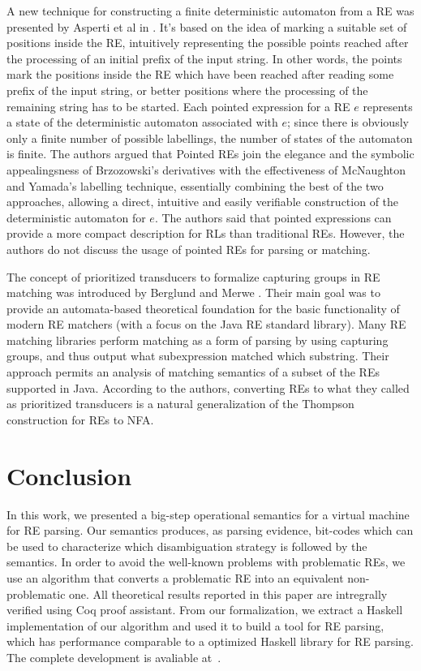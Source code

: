 \documentclass[review]{elsarticle}
\theoremstyle{definition}
\begin{document}
A new technique for constructing a finite deterministic automaton from a RE was presented by Asperti et al in \cite{Asperti10}. It's based on the idea of marking a suitable set of positions inside the RE, intuitively representing the possible points reached after the processing of an initial prefix of the input string. In other words, the points mark the positions inside the RE which have been reached after reading some prefix of the input string, or better positions where the processing of the remaining string has to be started. Each pointed expression for a RE $e$ represents a state of the deterministic automaton associated with $e$; since there is obviously only a finite number of possible labellings, the number of states of the automaton is finite. The authors argued that Pointed REs join the elegance and the symbolic appealingsness of Brzozowski's derivatives with the effectiveness of McNaughton and Yamada's labelling technique, essentially combining the best of the two approaches, allowing a direct, intuitive and easily verifiable construction of the deterministic automaton for $e$. The authors said that pointed expressions can provide a more compact description for RLs than traditional REs. However, the authors do not discuss the usage of pointed REs for parsing or matching.

The concept of prioritized transducers to formalize capturing groups in RE
matching was introduced by Berglund and Merwe \cite{Berglund2016}. Their main
goal was to provide an automata-based theoretical foundation for the basic
functionality of modern RE matchers (with a focus on the Java RE standard
library). Many RE matching libraries perform matching as a form of parsing by 
using capturing groups, and thus output what subexpression matched which
substring. Their approach permits an analysis of matching semantics of a 
subset of the REs supported in Java. According to the authors, converting REs 
to what they called as prioritized transducers is a natural generalization of 
the Thompson construction for REs to NFA.

\section{Conclusion}\label{section:conclusion}

In this work, we presented a big-step operational semantics for a virtual machine for RE parsing. 
Our semantics produces, as parsing evidence, bit-codes which can be used to characterize which
disambiguation strategy is followed by the semantics. In order to avoid the well-known problems with 
problematic REs, we use an algorithm that converts a problematic RE into an equivalent non-problematic one.
All theoretical results reported in this paper are intregrally verified using
Coq proof assistant. 
From our formalization, we extract a Haskell implementation of our algorithm and used it to build 
a tool for RE parsing, which has performance comparable to a optimized Haskell library
for RE parsing. The complete development is avaliable at~\cite{regexvm-rep}.
\end{document}
